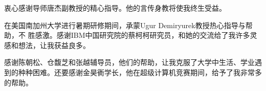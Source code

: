 
\begin{ack}
  衷心感谢导师唐杰副教授的精心指导。他的言传身教将使我终生受益。

  在美国南加州大学进行暑期研修期间，承蒙Ugur Demiryurek教授热心指导与帮助，不
  胜感激。感谢IBM中国研究院的蔡柯柯研究员，和她的交流给了我许多灵感和想法，让我获益良多。

  感谢陈朝松、仓馥芝和张越辅导员，他们的帮助，让我克服了大学中生活、学业遇到的种种困难。还要感谢金昊衠学长，他在超级计算机竞赛期间，给予了我非常多的帮助。
\end{ack}

